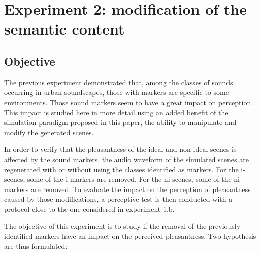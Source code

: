 \documentclass[twoside,twocolumn]{article}
\begin{document}
\section{Experiment 2: modification of the semantic content}
\label{sec:modification}

\subsection{Objective}


The previous experiment demonstrated that, among the classes of sounds occurring in urban soundscapes, those with markers are specific to some environments. Those sound markers seem to have a great impact on perception. This impact is studied here in more detail using an added benefit of the simulation paradigm proposed in this paper, the ability to manipulate and modify the generated scenes.


In order to verify that the pleasantness of the ideal and non ideal scenes is affected by the sound markers, the audio waveform of the simulated scenes are regenerated with or without using the classes identified as markers. For the i-scenes, some of the i-markers are removed. For the ni-scenes, some of the ni-markers are removed. To evaluate the impact on the perception of pleasantness caused by those modifications, a perceptive test is then conducted with a protocol close to the one considered in experiment 1.b.


The objective of this experiment is to study if the removal of the previously identified markers have an impact on the perceived pleasantness. Two hypothesis are thus formulated:
\end{document}
